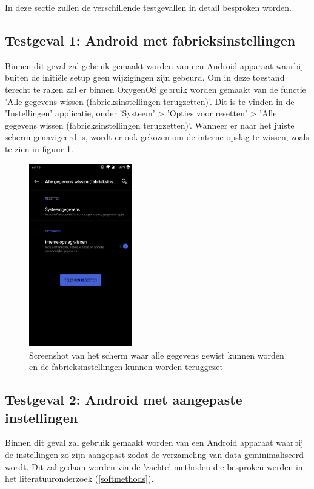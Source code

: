 In deze sectie zullen de verschillende testgevallen in detail besproken worden.

\subsection{Testgeval 1: Android met fabrieksinstellingen}
\label{sec:testgeval1}
Binnen dit geval zal gebruik gemaakt worden van een Android apparaat waarbij buiten de initiële setup geen wijzigingen zijn gebeurd. Om in deze toestand terecht te raken zal er binnen OxygenOS gebruik worden gemaakt van de functie 'Alle gegevens wissen (fabrieksinstellingen terugzetten)'. Dit is te vinden in de 'Instellingen' applicatie, onder 'Systeem' >  'Opties voor resetten' > 'Alle gegevens wissen (fabrieksinstellingen terugzetten)'. Wanneer er naar het juiste scherm genavigeerd is, wordt er ook gekozen om de interne opslag te wissen, zoals te zien in figuur \ref{fig:fabrieksinstellingen}.

\begin{figure}
    \centering
    \includegraphics[width=0.4\textwidth]{img/fabrieksinstellingen.jpg}
    \caption{Screenshot van het scherm waar alle gegevens gewist kunnen worden en de fabrieksinstellingen kunnen worden teruggezet}
    \label{fig:fabrieksinstellingen}
\end{figure}


\subsection{Testgeval 2: Android met aangepaste instellingen}
\label{sec:testgeval2}
Binnen dit geval zal gebruik gemaakt worden van een Android apparaat waarbij de instellingen zo zijn aangepast zodat de verzameling van data geminimaliseerd wordt. Dit zal gedaan worden via de 'zachte' methoden die besproken werden in het literatuuronderzoek (\ref{softmethods}).


